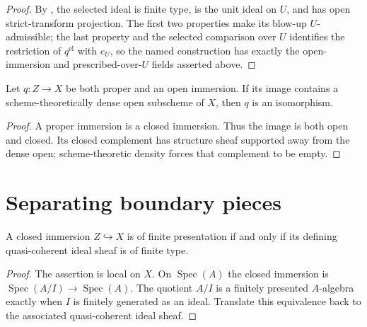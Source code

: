 \begin{proof}
  By , the selected ideal is finite type,
  is the unit ideal on $U$, and has open strict-transform projection.  The
  first two properties make its blow-up $U$-admissible; the last property and
  the selected comparison over $U$ identifies the restriction of
  $q^{\mathrm{el}}$ with $e_U$, so the named construction has exactly the
  open-immersion and prescribed-over-$U$ fields asserted above.
\end{proof}

\begin{lemma}
  \label{lemma:nagata-proper-open-dense-iso}

  Let $q\colon Z\to X$ be both proper and an open immersion.  If its image
  contains a scheme-theoretically dense open subscheme of $X$, then $q$ is an
  isomorphism.
\end{lemma}

\begin{proof}
  A proper immersion is a closed immersion.  Thus the image is both open and
  closed.  Its closed complement has structure sheaf supported away from the
  dense open; scheme-theoretic density forces that complement to be empty.
\end{proof}

\section{Separating boundary pieces}

\begin{lemma}
  \label{lemma:nagata-closed-fp-ideal-finite-type}

  A closed immersion $Z\hookrightarrow X$ is of finite presentation if and
  only if its defining quasi-coherent ideal sheaf is of finite type.
\end{lemma}

\begin{proof}
  The assertion is local on $X$.  On $\operatorname{Spec}(A)$ the closed
  immersion is $\operatorname{Spec}(A/I)\to\operatorname{Spec}(A)$.  The
  quotient $A/I$ is a finitely presented $A$-algebra exactly when $I$ is
  finitely generated as an ideal.  Translate this equivalence back to the
  associated quasi-coherent ideal sheaf.
\end{proof}

